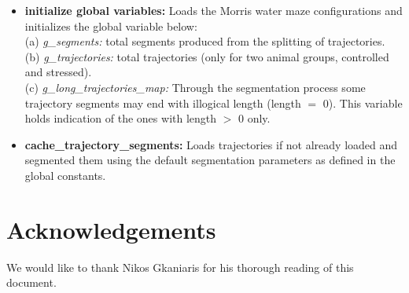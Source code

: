 \documentclass[12pt,titlepage]{article}
\begin{document}
\begin{doublespace}
\begin{itemize}
	\item\textbf{initialize global variables:} Loads the Morris water maze configurations and initializes the global variable below:\\
	(a) \textit{g\_segments:} total segments produced from the splitting of trajectories.\\
	(b) \textit{g\_trajectories:} total trajectories (only for two animal groups, controlled and stressed).\\
	(c) \textit{g\_long\_trajectories\_map:} Through the segmentation process some trajectory segments may end with illogical length (length $=$ 0). This variable holds  indication of the ones with length $>$ 0 only.
	\item\textbf{cache\_trajectory\_segments:} Loads trajectories if not already loaded and segmented them using the default segmentation parameters as defined in the global constants.
\end{itemize}	

\section*{Acknowledgements}
We would like to thank Nikos Gkaniaris for his thorough reading of this document.


\end{doublespace}
	
\end{document}
